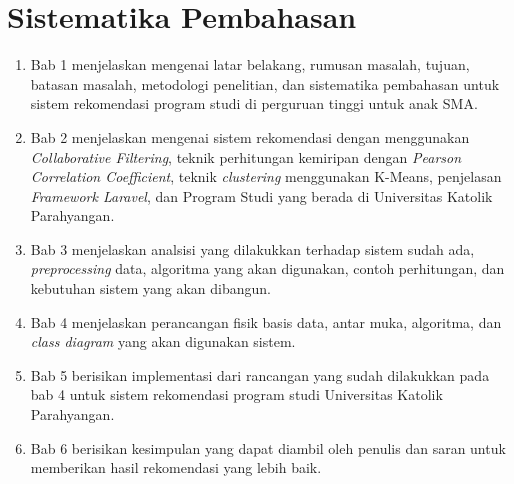 \section{Sistematika Pembahasan}
\label{sec:sispem}
\begin{enumerate}
	\item Bab 1 menjelaskan mengenai latar belakang, rumusan masalah, tujuan, batasan masalah, metodologi penelitian, dan sistematika pembahasan untuk sistem rekomendasi program studi di perguruan tinggi untuk anak SMA.
	
	\item Bab 2 menjelaskan mengenai sistem rekomendasi dengan menggunakan \textit{Collaborative Filtering}, teknik perhitungan kemiripan dengan \textit{Pearson Correlation Coefficient}, teknik \textit{clustering} menggunakan K-Means, penjelasan \textit{Framework Laravel}, dan Program Studi yang berada di Universitas Katolik Parahyangan. 
	
	\item Bab 3 menjelaskan analsisi yang dilakukkan terhadap sistem sudah ada, \textit{preprocessing} data, algoritma yang akan digunakan, contoh perhitungan, dan kebutuhan sistem yang akan dibangun.
	
	\item Bab 4 menjelaskan perancangan fisik basis data, antar muka, algoritma, dan \textit{class diagram} yang akan digunakan sistem.
	
	\item Bab 5 berisikan implementasi dari rancangan yang sudah dilakukkan pada bab 4 untuk sistem rekomendasi program studi Universitas Katolik Parahyangan.
	
	\item Bab 6 berisikan kesimpulan yang dapat diambil oleh penulis dan saran untuk memberikan hasil rekomendasi yang lebih baik.
\end{enumerate}
